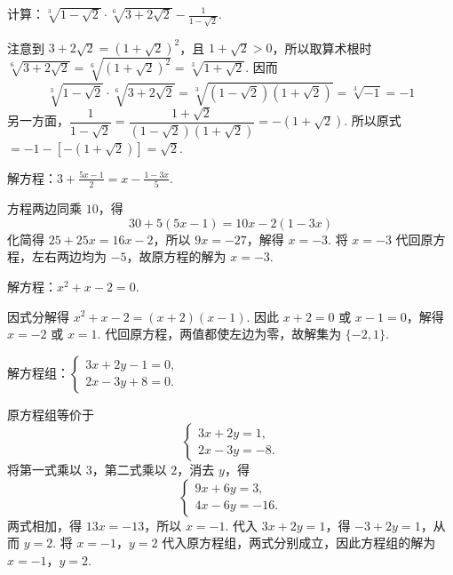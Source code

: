 \begin{problem}
计算：\(\sqrt[3]{1-\sqrt{2}}\cdot\sqrt[6]{3+2\sqrt{2}}-\frac{1}{1-\sqrt{2}}\).
\end{problem}

\begin{solution}
注意到 \(3+2\sqrt{2}=\left(1+\sqrt{2}\right)^2\)，且 \(1+\sqrt{2}>0\)，所以取算术根时
\(\sqrt[6]{3+2\sqrt{2}}=\sqrt[6]{\left(1+\sqrt{2}\right)^2}=\sqrt[3]{1+\sqrt{2}}\). 因而
\[
\sqrt[3]{1-\sqrt{2}}\cdot\sqrt[6]{3+2\sqrt{2}}=\sqrt[3]{\left(1-\sqrt{2}\right)\left(1+\sqrt{2}\right)}=\sqrt[3]{-1}=-1
\]
另一方面，\(\dfrac{1}{1-\sqrt{2}}=\dfrac{1+\sqrt{2}}{(1-\sqrt{2})(1+\sqrt{2})}=-(1+\sqrt{2})\). 所以原式
\(=-1-\left[-(1+\sqrt{2})\right]=\sqrt{2}\).
\end{solution}

\begin{problem}
解方程：\(3+\frac{5x-1}{2}=x-\frac{1-3x}{5}\).
\end{problem}

\begin{solution}
方程两边同乘 \(10\)，得
\[
30+5(5x-1)=10x-2(1-3x)
\]
化简得 \(25+25x=16x-2\)，所以 \(9x=-27\)，解得 \(x=-3\). 将 \(x=-3\) 代回原方程，左右两边均为 \(-5\)，故原方程的解为 \(x=-3\).
\end{solution}

\begin{problem}
解方程：\(x^2+x-2=0\).
\end{problem}

\begin{solution}
因式分解得 \(x^2+x-2=(x+2)(x-1)\). 因此
\(x+2=0\) 或 \(x-1=0\)，解得 \(x=-2\) 或 \(x=1\). 代回原方程，两值都使左边为零，故解集为 \(\{-2,1\}\).
\end{solution}

\begin{problem}
解方程组：\(\begin{cases}
3x+2y-1=0,\\
2x-3y+8=0.
\end{cases}\)
\end{problem}

\begin{solution}
原方程组等价于
\[
\begin{cases}
3x+2y=1,\\
2x-3y=-8.
\end{cases}
\]
将第一式乘以 \(3\)，第二式乘以 \(2\)，消去 \(y\)，得
\[
\begin{cases}
9x+6y=3,\\
4x-6y=-16.
\end{cases}
\]
两式相加，得 \(13x=-13\)，所以 \(x=-1\). 代入 \(3x+2y=1\)，得 \(-3+2y=1\)，从而 \(y=2\). 将 \(x=-1\)，\(y=2\) 代入原方程组，两式分别成立，因此方程组的解为 \(x=-1\)，\(y=2\).
\end{solution}

